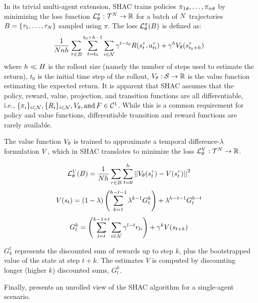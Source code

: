 In its trivial multi-agent extension, SHAC trains policies ${\pi_1}_\theta,\dots,{\pi_n}_\theta$ by minimizing the loss function $\mathcal{L}_\theta^{\pi}:\mathcal{T}^N\rightarrow\mathbb{R}$ for a batch of $N$ trajectories $B = \{\tau_1, \ldots, \tau_N\}$ sampled using $\pi$. The loss $\mathcal{L}_\theta^{\pi}(B)$ is defined as:  
\begin{equation*}\label{eq:shac}
    \frac{1}{Nnh}\sum_{\tau\in B} \sum_{t=t_0}^{t_0+h-1} \sum_{i\in\mathcal{N}} \gamma^{t-t_0} R(s_{t}^\tau, a_{ti}^\tau) + \gamma^h V_\theta(s^\tau_{t_0+h})
\end{equation*}
where $h \ll H$ is the rollout size (namely the number of steps used to estimate the return), $t_0$ is the initial time step of the rollout, $V_\theta: \mathcal{S} \rightarrow \mathbb{R}$ is the value function estimating the expected return. It is apparent that SHAC assumes that the policy, reward, value, projection, and transition functions are all differentiable, i.e., $\{\pi_{i}\}_{i\in\mathcal{N}},\{R_{i}\}_{i\in\mathcal{N}},V_\theta, \text{and} \, F \in \mathcal{C}^1$. While this is a common requirement for policy and value functions, differentiable transition and reward functions are rarely available. 

The value function $V_\theta$ is trained to approximate a temporal difference-$\lambda$ formulation \cite{Sutton98} $V$, which in SHAC translates to minimize the loss $\mathcal{L}_\theta^{V}:\mathcal{T}^N\rightarrow\mathbb{R}$.

$$ \mathcal{L}_\theta^V(B)=\frac{1}{Nh}\sum_{\tau\in B}\sum_{t=0}^h\left|\left| V_\theta(s^\tau_t) - V(s^\tau_t) \right|\right|^2 $$
$$ V(s_t) = (1-\lambda) \left(\sum_{k=1}^{h-t-1}\lambda^{k-1}G_t^k\right) + \lambda^{h-t-1}G_t^{h-t}$$
$$ G_t^k = \left(\sum_{l=t}^{k-1+t}\sum_{i\in\mathcal{N}}\gamma^{l-t} r_{li}\right) + \gamma^k V(s_{t+k})$$

$G^t_k$ represents the discounted sum of rewards up to step $k$, plus the bootstrapped value of the state at step $t+k$. The estimates $V$ is computed by discounting longer (higher $k$) discounted sums, $G^k_t$.

Finally,  presents an unrolled view of the SHAC algorithm for a single-agent scenario.
